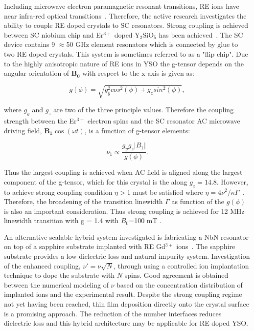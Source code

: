 Including microwave electron paramagnetic resonant transitions, RE ions have near infra-red optical transitions~\citep{PhysRevB.94.155116}. Therefore, the active research investigates the ability to couple RE doped crystals to SC resonators. Strong coupling is achieved between SC niobium chip and Er$^{3+}$ doped Y$_{2}$SiO$_{5}$ has been achieved~\citep{PhysRevLett.110.157001}. The SC device contains 9 $\approx$50 GHz element resonators which is connected by glue to two RE doped crystals. This system is sometimes referred to as a "flip chip". Due to the highly anisotropic nature of RE ions in YSO the g-tensor depends on the angular orientation of $\bm{B_{0}}$ with respect to the x-axis is given as:

\begin{equation}
\label{eq:qubit}
g(\phi) = \sqrt{g_{y}^{2}cos^{2}(\phi)+g_{z}sin^{2}(\phi)},  
\end{equation}

\noindent where $g_{y}$ and $g_{z}$ are two of the three principle values. Therefore the coupling strength between the Er$^{3+}$ electron spins and the SC resonator AC microwave driving field, $\bm{B_{1}}\cos(\omega t)$, is a function of g-tensor elements: 

\begin{equation}
\label{eq:qubit}
\nu_{1} \propto \frac{g_{y}g_{z}\left | B_{1} \right |}{g(\phi)}.  
\end{equation}

Thus the largest coupling is achieved when AC field is aligned along the largest component of the g-tensor, which for this crystal is the along $g_{z} = 14.8$. However, to achieve strong coupling condition $\eta > 1$ must be satisfied where $\eta =4\nu^{2}/\kappa \Gamma$~\citep{TANJISUZUKI2011201}. Therefore, the broadening of the transition linewidth $\Gamma$ as function of the $g(\phi)$ is also an important consideration. Thus strong coupling is achieved for 12 MHz linewidth transition with g = 1.4 with $B_{0}$=100 mT .     


An alternative scalable hybrid system investigated is fabricating a NbN resonator on top of a sapphire substrate implanted with RE Gd$^{3+}$ ions~\citep{doi:10.1063/1.4894455}. The sapphire substrate provides a low dielectric loss and natural impurity system. Investigation of the enhanced coupling, $\nu'=\nu \sqrt{N}$, through using a controlled ion implantation technique to dope the substrate with $N$ spins. Good agreement is obtained between the numerical modeling of $\nu$ based on the concentration distribution of implanted ions and the experimental result. Despite the strong coupling regime not yet having been reached, thin film deposition directly onto the crystal surface is a promising approach. The reduction of the number interfaces reduces dielectric loss and this hybrid architecture may be applicable for RE doped YSO. 

